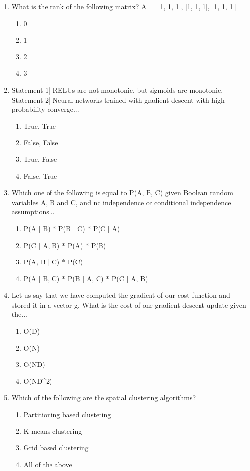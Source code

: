 \documentclass[12pt]{article}
\begin{document}
\begin{enumerate}[label=\arabic*.]
\begin{enumerate}[label=(\alph*)]
    \item P(A|B) decreases
    \item P(B|A) decreases
    \item P(B) decreases
    \item All of above
\end{enumerate}
\item What is the rank of the following matrix? A = [[1, 1, 1], [1, 1, 1], [1, 1, 1]]
\begin{enumerate}[label=(\alph*)]
    \item 0
    \item 1
    \item 2
    \item 3
\end{enumerate}
\item Statement 1| RELUs are not monotonic, but sigmoids are monotonic. Statement 2| Neural networks trained with gradient descent with high probability converge...
\begin{enumerate}[label=(\alph*)]
    \item True, True
    \item False, False
    \item True, False
    \item False, True
\end{enumerate}
\item Which one of the following is equal to P(A, B, C) given Boolean random variables A, B and C, and no independence or conditional independence assumptions...
\begin{enumerate}[label=(\alph*)]
    \item P(A | B) * P(B | C) * P(C | A)
    \item P(C | A, B) * P(A) * P(B)
    \item P(A, B | C) * P(C)
    \item P(A | B, C) * P(B | A, C) * P(C | A, B)
\end{enumerate}
\item Let us say that we have computed the gradient of our cost function and stored it in a vector g. What is the cost of one gradient descent update given the...
\begin{enumerate}[label=(\alph*)]
    \item O(D)
    \item O(N)
    \item O(ND)
    \item O(ND\^{}2)
\end{enumerate}
\item Which of the following are the spatial clustering algorithms?
\begin{enumerate}[label=(\alph*)]
    \item Partitioning based clustering
    \item K-means clustering
    \item Grid based clustering
    \item All of the above
\end{enumerate}
\end{enumerate}
\end{document}
